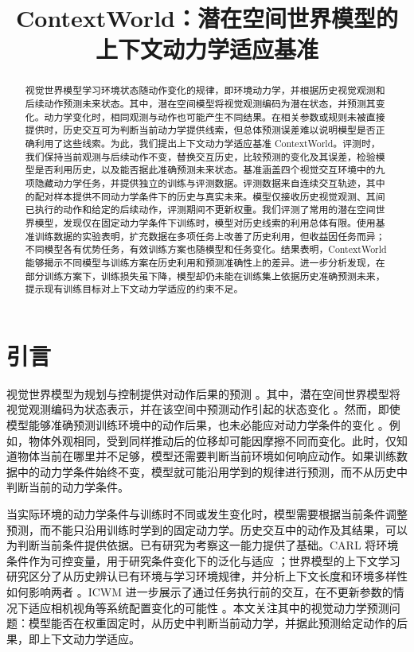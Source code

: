 \documentclass[10pt,twocolumn,letterpaper]{article}
\title{ContextWorld：潜在空间世界模型的上下文动力学适应基准}
\author{}
\begin{document}
\maketitle
\begin{abstract}
视觉世界模型学习环境状态随动作变化的规律，即环境动力学，并根据历史视觉观测和后续动作预测未来状态。其中，潜在空间模型将视觉观测编码为潜在状态，并预测其变化。动力学变化时，相同观测与动作也可能产生不同结果。在相关参数或规则未被直接提供时，历史交互可为判断当前动力学提供线索，但总体预测误差难以说明模型是否正确利用了这些线索。为此，我们提出上下文动力学适应基准 ContextWorld。评测时，我们保持当前观测与后续动作不变，替换交互历史，比较预测的变化及其误差，检验模型是否利用历史，以及能否据此准确预测未来状态。基准涵盖四个视觉交互环境中的九项隐藏动力学任务，并提供独立的训练与评测数据。评测数据来自连续交互轨迹，其中的配对样本提供不同动力学条件下的历史与真实未来。模型仅接收历史视觉观测、其间已执行的动作和给定的后续动作，评测期间不更新权重。我们评测了常用的潜在空间世界模型，发现仅在固定动力学条件下训练时，模型对历史线索的利用总体有限。使用基准训练数据的实验表明，扩充数据在多项任务上改善了历史利用，但收益因任务而异；不同模型各有优势任务，有效训练方案也随模型和任务变化。结果表明，ContextWorld 能够揭示不同模型与训练方案在历史利用和预测准确性上的差异。进一步分析发现，在部分训练方案下，训练损失虽下降，模型却仍未能在训练集上依据历史准确预测未来，提示现有训练目标对上下文动力学适应的约束不足。
\end{abstract}
\section{引言}
\label{sec:introduction}

视觉世界模型为规划与控制提供对动作后果的预测 \cite{ha2018worldmodels}。其中，潜在空间世界模型将视觉观测编码为状态表示，并在该空间中预测动作引起的状态变化 \cite{hafner2019planet,hafner2020dreamer}。然而，即使模型能够准确预测训练环境中的动作后果，也未必能应对动力学条件的变化 \cite{wang2026context}。例如，物体外观相同，受到同样推动后的位移却可能因摩擦不同而变化。此时，仅知道物体当前在哪里并不足够，模型还需要判断当前环境如何响应动作。如果训练数据中的动力学条件始终不变，模型就可能沿用学到的规律进行预测，而不从历史中判断当前的动力学条件。

当实际环境的动力学条件与训练时不同或发生变化时，模型需要根据当前条件调整预测，而不能只沿用训练时学到的固定动力学。历史交互中的动作及其结果，可以为判断当前条件提供依据。已有研究为考察这一能力提供了基础。CARL 将环境条件作为可控变量，用于研究条件变化下的泛化与适应 \cite{benjamins2021carl}；世界模型的上下文学习研究区分了从历史辨认已有环境与学习环境规律，并分析上下文长度和环境多样性如何影响两者 \cite{wang2026context}。ICWM 进一步展示了通过任务执行前的交互，在不更新参数的情况下适应相机视角等系统配置变化的可能性 \cite{wang2026icwm}。本文关注其中的视觉动力学预测问题：模型能否在权重固定时，从历史中判断当前动力学，并据此预测给定动作的后果，即上下文动力学适应。
\end{document}
